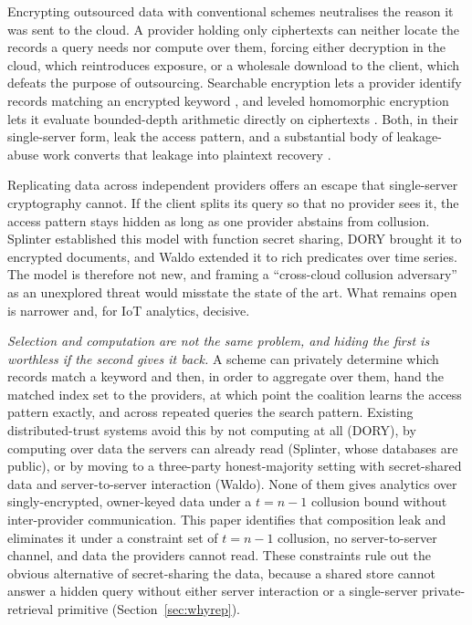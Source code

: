 \documentclass[a4paper,fleqn]{cas-dc}
\begin{document}
Encrypting outsourced data with conventional schemes neutralises the reason it
was sent to the cloud. A provider holding only ciphertexts can neither locate
the records a query needs nor compute over them, forcing either decryption in
the cloud, which reintroduces exposure, or a wholesale download to the client,
which defeats the purpose of outsourcing. Searchable encryption lets a
provider identify records matching an encrypted keyword
\citep{song2000practical,curtmola2006searchable,islam2023keyword}, and leveled
homomorphic encryption lets it evaluate bounded-depth arithmetic directly on
ciphertexts \citep{fan2012somewhat,cryptoeprint:2016/421}. Both, in their
single-server form, leak the access pattern, and a substantial body of
leakage-abuse work converts that leakage into plaintext recovery
\citep{islam2012access,cash2015leakage,grubbs2017leakage}.

Replicating data across independent providers offers an escape that
single-server cryptography cannot. If the client splits its query so that no
provider sees it, the access pattern stays hidden as long as one provider
abstains from collusion. Splinter \citep{splinter} established this model with
function secret sharing, DORY \citep{dory} brought it to encrypted documents,
and Waldo \citep{waldo} extended it to rich predicates over time series. The
model is therefore not new, and framing a ``cross-cloud collusion adversary''
as an unexplored threat would misstate the state of the art. What remains open
is narrower and, for IoT analytics, decisive.

\emph{Selection and computation are not the same problem, and hiding the first
is worthless if the second gives it back.} A scheme can privately determine
which records match a keyword and then, in order to aggregate over them, hand
the matched index set to the providers, at which point the coalition learns
the access pattern exactly, and across repeated queries the search pattern.
Existing distributed-trust systems avoid this by not computing at all (DORY),
by computing over data the servers can already read (Splinter, whose databases
are public), or by moving to a three-party honest-majority setting with
secret-shared data and server-to-server interaction (Waldo). None of them
gives analytics over singly-encrypted, owner-keyed data under a $t=n-1$
collusion bound without inter-provider communication. This paper identifies
that composition leak and eliminates it under a constraint set of $t=n-1$
collusion, no server-to-server channel, and data the providers cannot read.
These constraints rule out the obvious alternative of secret-sharing the
data, because a shared store cannot answer a hidden query without either
server interaction or a single-server private-retrieval primitive
(Section~\ref{sec:whyrep}).
\end{document}
